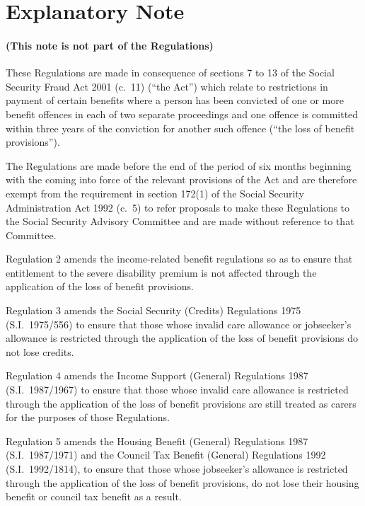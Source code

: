 \documentclass[12pt,a4paper]{article}
\begin{document}
\small

\part{Explanatory Note}

\renewcommand\parthead{— Explanatory Note}

\subsection*{(This note is not part of the Regulations)}

These Regulations are made in consequence of sections 7 to 13 of the Social Security Fraud Act 2001 (c.\ 11) (“the Act”) which relate to restrictions in payment of certain benefits where a person has been convicted of one or more benefit offences in each of two separate proceedings and one offence is committed within three years of the conviction for another such offence (“the loss of benefit provisions”).

The Regulations are made before the end of the period of six months beginning with the coming into force of the relevant provisions of the Act and are therefore exempt from the requirement in section 172(1) of the Social Security Administration Act 1992 (c.\ 5) to refer proposals to make these Regulations to the Social Security Advisory Committee and are made without reference to that Committee.

Regulation 2 amends the income-related benefit regulations so as to ensure that entitlement to the severe disability premium is not affected through the application of the loss of benefit provisions.

Regulation 3 amends the Social Security (Credits) Regulations 1975 (S.I.\ 1975/556) to ensure that those whose invalid care allowance or jobseeker’s allowance is restricted through the application of the loss of benefit provisions do not lose credits.

Regulation 4 amends the Income Support (General) Regulations 1987 (S.I.\ 1987/1967) to ensure that those whose invalid care allowance is restricted through the application of the loss of benefit provisions are still treated as carers for the purposes of those Regulations.

Regulation 5 amends the Housing Benefit (General) Regulations 1987 (S.I.\ 1987/1971) and the Council Tax Benefit (General) Regulations 1992 (S.I.\ 1992/1814), to ensure that those whose jobseeker’s allowance is restricted through the application of the loss of benefit provisions, do not lose their housing benefit or council tax benefit as a result.
\end{document}
